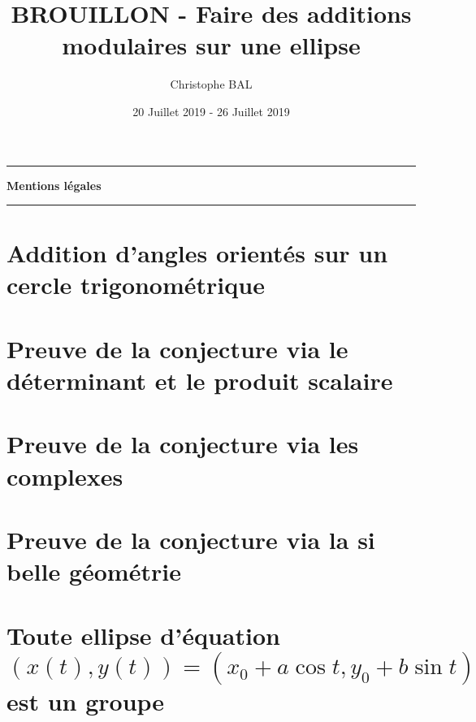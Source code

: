 \documentclass[12pt]{amsart}
\begin{document}
\title{BROUILLON - Faire des additions modulaires sur une ellipse}
\author{Christophe BAL}
\date{20 Juillet 2019 - 26 Juillet 2019}
\maketitle


\begin{center}
	\hrule\vspace{.3em}
	{
		\fontsize{1.35em}{1em}\selectfont
		\textbf{Mentions \og légales \fg}
	}
			
	\vspace{0.45em}
	\doclicenseThis
	\hrule
\end{center}



\setcounter{tocdepth}{2}
\tableofcontents




\newpage
\section{Addition d'angles orientés sur un cercle trigonométrique}






\section{Preuve de la conjecture via le déterminant et le produit scalaire} 






\section{Preuve de la conjecture via les complexes}
                        





\section{Preuve de la conjecture via la si belle géométrie} 






\section{\texorpdfstring{Toute ellipse d'équation $(x(t) , y(t)) = (x_0 + a \cos t , y_0 + b \sin t)$ est un groupe}%
                        {Toute ellipse d'équation (x(t) , y(t)) = (x0 + a cos t , y0 + b sin t) est un groupe}}
      

\end{document}
